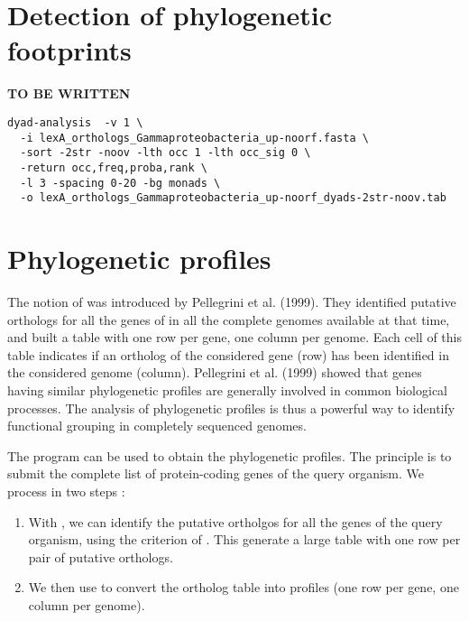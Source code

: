 \section{Detection of phylogenetic footprints}

\textbf{TO BE WRITTEN}

\begin{small}
\begin{verbatim}
dyad-analysis  -v 1 \
  -i lexA_orthologs_Gammaproteobacteria_up-noorf.fasta \
  -sort -2str -noov -lth occ 1 -lth occ_sig 0 \
  -return occ,freq,proba,rank \
  -l 3 -spacing 0-20 -bg monads \
  -o lexA_orthologs_Gammaproteobacteria_up-noorf_dyads-2str-noov.tab
\end{verbatim}
\end{small}

\section{Phylogenetic profiles}

The notion of  was introduced by
Pellegrini et al. (1999). They identified putative orthologs for all
the genes of  in all the complete genomes
available at that time, and built a table with one row per gene, one
column per genome. Each cell of this table indicates if an ortholog of
the considered gene (row) has been identified in the considered genome
(column). Pellegrini et al. (1999) showed that genes having similar
phylogenetic profiles are generally involved in common biological
processes. The analysis of phylogenetic profiles is thus a powerful
way to identify functional grouping in completely sequenced genomes.

The program  can be used to obtain the
phylogenetic profiles. The principle is to submit the complete list of
protein-coding genes of the query organism. We process in two steps : 

\begin{enumerate}

\item With \program{get-orthologs}, we can identify the putative
  ortholgos for all the genes of the query organism, using the
  criterion of . This generate a
  large table with one row per pair of putative orthologs.

\item We then use \program{convert-classes} to convert the ortholog
  table into profiles (one row per gene, one column per genome).

\end{enumerate}

